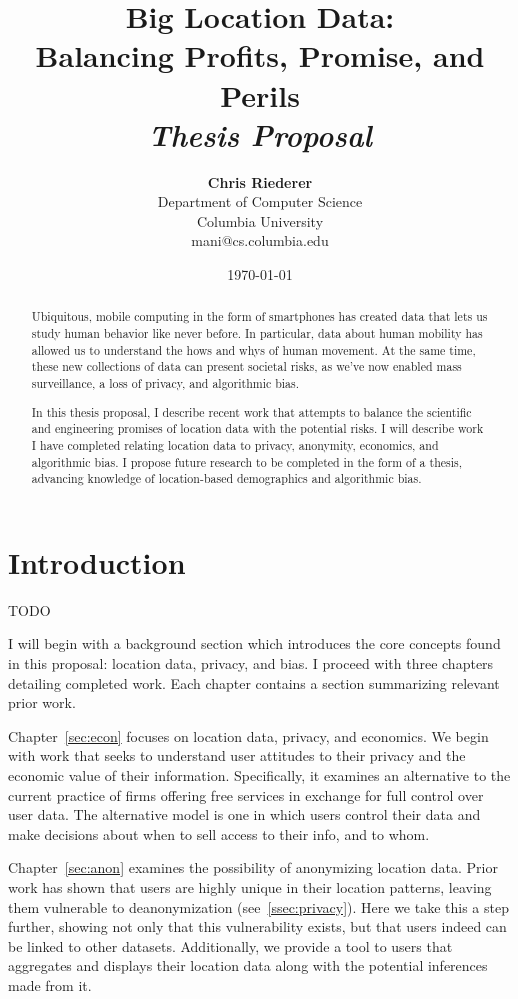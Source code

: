 \documentclass[12pt]{article}
\title{{\bf Big Location Data: \\ Balancing Profits, Promise, and Perils} \\
\it Thesis Proposal}
\author{ {\bf Chris Riederer}  \\
Department of Computer Science \\
Columbia University\\
{\small mani@cs.columbia.edu}
}
\date{\today}
\newcommand{\chap}[1]{Chapter~\ref{#1}}
\begin{document}
\pagestyle{plain}
\maketitle

\pagebreak
\begin{abstract}

Ubiquitous, mobile computing in the form of smartphones has created data that lets us study human behavior like never before.
In particular, data about human mobility has allowed us to understand the hows and whys of human movement.
At the same time, these new collections of data can present societal risks, as we've now enabled mass surveillance, a loss of privacy, and algorithmic bias.

In this thesis proposal, I describe recent work that attempts to balance the scientific and engineering promises of location data with the potential risks.
I will describe work I have completed relating location data to privacy, anonymity, economics, and algorithmic bias.
I propose future research to be completed in the form of a thesis, advancing knowledge of location-based demographics and algorithmic bias.

\end{abstract}

\pagebreak
\tableofcontents
\pagebreak

\cleardoublepage
{}

\section{Introduction}
\label{ch:intro}

TODO

I will begin with a background section which introduces the core concepts found in this proposal: location data, privacy, and bias.
I proceed with three chapters detailing completed work.
Each chapter contains a section summarizing relevant prior work.

\chap{sec:econ} focuses on location data, privacy, and economics.
We begin with work that seeks to understand user attitudes to their privacy and the economic value of their information.
Specifically, it examines an alternative to the current practice of firms offering free services in exchange for full control over user data.
The alternative model is one in which users control their data and make decisions about when to sell access to their info, and to whom.

\chap{sec:anon} examines the possibility of anonymizing location data.
Prior work has shown that users are highly unique in their location patterns, leaving them vulnerable to deanonymization (see~\ref{ssec:privacy}).
Here we take this a step further, showing not only that this vulnerability exists, but that users indeed can be linked to other datasets.
Additionally, we provide a tool to users that aggregates and displays their location data along with the potential inferences made from it.
\end{document}
